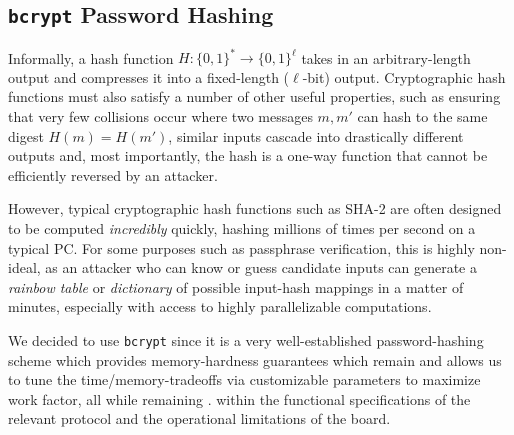 
\subsection{\texttt{bcrypt} Password Hashing}

Informally, a hash function $H : \{0,1\}^* \to \{0,1\}^\ell$ takes in an arbitrary-length output and compresses it into a fixed-length ($\ell$-bit) output.
\iflong 
Cryptographic hash functions must also satisfy a number of other useful properties, such as ensuring that very few collisions occur where two messages $m,m'$ can hash to the same digest $H(m) = H(m')$, similar inputs cascade into drastically different outputs and, most importantly, the hash is a one-way function that cannot be efficiently reversed by an attacker.

However, typical cryptographic hash functions such as SHA-2 are often designed to be computed \emph{incredibly} quickly, hashing millions of times per second on a typical PC. For some purposes such as passphrase verification, this is highly non-ideal, as an attacker who can know or guess candidate inputs can generate a \emph{rainbow table} or \emph{dictionary} of possible input-hash mappings in a matter of minutes, especially with access to highly parallelizable computations.

\fi
We decided to use \texttt{bcrypt} since it is a very well-established password-hashing scheme which provides memory-hardness guarantees which remain
\iflong
and allows us to tune the time/memory-tradeoffs via customizable parameters to maximize work factor, all while remaining .
\else
within the functional specifications of the relevant protocol and the operational limitations of the board.
\fi




